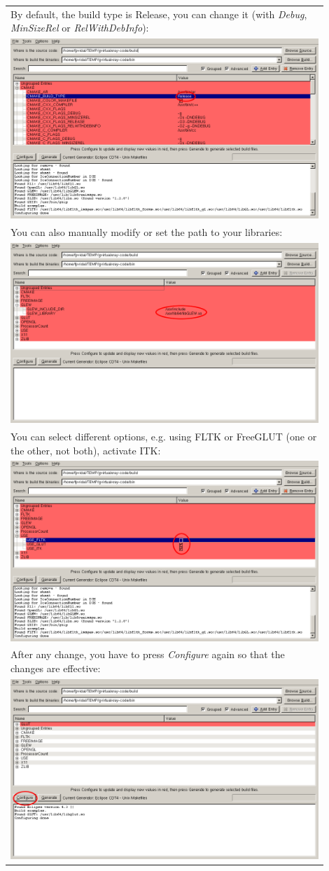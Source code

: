 \documentclass[11pt,oneside,a4paper,final]{article}
\begin{document}
\begin{center}
\begin{longtable}{|p{0.9\linewidth}|}
		By default, the build type is Release, you can change it (with \emph{Debug}, \emph{MinSizeRel} or \emph{RelWithDebInfo}):\\
		\includegraphics[width=0.5\linewidth]{cmake-05}\\
		\hline

		You can also manually modify or set the path to your libraries:\\
		\includegraphics[width=0.5\linewidth]{cmake-09}\\
		\hline

		You can select different options, e.g. using \Gls{FLTK} or FreeGLUT (one or the other, not both), activate \Gls{ITK}:\\
		\includegraphics[width=0.5\linewidth]{cmake-06}\\
		\hline

		After any change, you have to press \emph{Configure} again so that the changes are effective:\\
		\includegraphics[width=0.5\linewidth]{cmake-07}\\
		\hline


\end{longtable}
\end{center}
\end{document}

